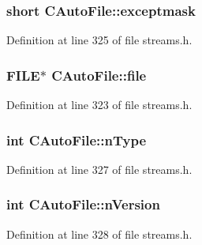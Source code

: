 \subsubsection[{exceptmask}]{\setlength{\rightskip}{0pt plus 5cm}short C\+Auto\+File\+::exceptmask\hspace{0.3cm}{\ttfamily [protected]}}\label{class_c_auto_file_a09729c28c239d6b157adee2c3853fa23}


Definition at line 325 of file streams.\+h.

\hypertarget{class_c_auto_file_a04ae666616ebc5d873c636fe6d2998ff}{}
\subsubsection[{file}]{\setlength{\rightskip}{0pt plus 5cm}F\+I\+L\+E$\ast$ C\+Auto\+File\+::file\hspace{0.3cm}{\ttfamily [protected]}}\label{class_c_auto_file_a04ae666616ebc5d873c636fe6d2998ff}


Definition at line 323 of file streams.\+h.

\hypertarget{class_c_auto_file_a39ca705ff45e36a05acd5df3c4114aef}{}
\subsubsection[{n\+Type}]{\setlength{\rightskip}{0pt plus 5cm}int C\+Auto\+File\+::n\+Type}\label{class_c_auto_file_a39ca705ff45e36a05acd5df3c4114aef}


Definition at line 327 of file streams.\+h.

\hypertarget{class_c_auto_file_a23fb456ee23003aebc3c58ab3fd683c1}{}
\subsubsection[{n\+Version}]{\setlength{\rightskip}{0pt plus 5cm}int C\+Auto\+File\+::n\+Version}\label{class_c_auto_file_a23fb456ee23003aebc3c58ab3fd683c1}


Definition at line 328 of file streams.\+h.

\hypertarget{class_c_auto_file_aa345c8c05e4b305762c35fffd4fe2f26}{}
